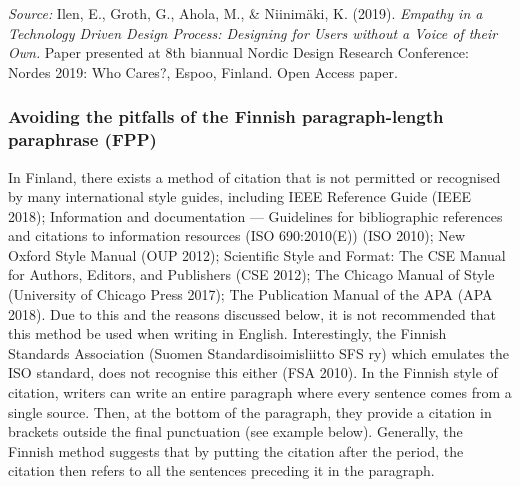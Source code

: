 \documentclass[english, 12pt, a4paper, sci, utf8, a-2b, online]{aaltothesis}
\begin{document}
\vspace{1ex}
\noindent
{}

\vspace{1ex}
\noindent
\textit{Source:} Ilen, E., Groth, G., Ahola, M., \& Niinimäki, K. (2019). 
\textit{Empathy in a Technology Driven Design Process: Designing for Users 
	without a Voice of their Own.} Paper presented at 8th biannual Nordic Design
	Research Conference: Nordes 2019: Who Cares?, Espoo, Finland. Open Access 
	paper.


\subsubsection*{Avoiding the pitfalls of the Finnish paragraph-length paraphrase
	 (FPP)}

In Finland, there exists a method of citation that is not permitted or 
recognised by many international style guides, including IEEE Reference Guide 
(IEEE 2018); Information and documentation --- Guidelines for bibliographic 
references and citations to information resources (ISO 690:2010(E)) (ISO 2010); 
New Oxford Style Manual (OUP 2012); Scientific Style and Format: The CSE Manual 
for Authors, Editors, and Publishers (CSE 2012); The Chicago Manual of Style 
(University of Chicago Press 2017); The Publication Manual of the APA (APA 
2018). Due to this and the reasons discussed below, it is not recommended that 
this method be used when writing in English. Interestingly, the Finnish 
Standards Association (Suomen Standardisoimisliitto SFS ry) which emulates the 
ISO standard, does not recognise this either (FSA 2010). In the Finnish style of
citation, writers can write an entire paragraph where every sentence comes from 
a single source. Then, at the bottom of the paragraph, they provide a citation 
in brackets outside the final punctuation (see example below). Generally, the 
Finnish method suggests that by putting the citation after the period, the 
citation then refers to all the sentences preceding it in the paragraph.
\end{document}
